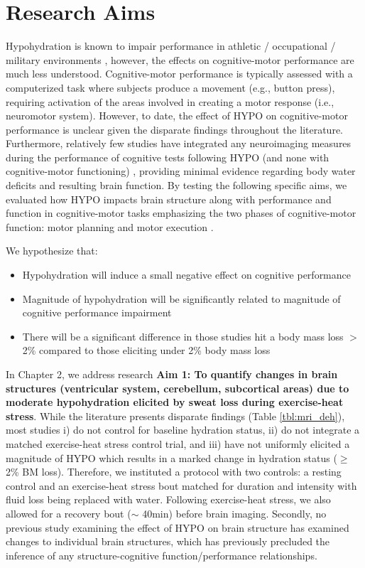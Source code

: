 \section{Research Aims}
Hypohydration is known to impair performance in athletic / occupational / military environments \cite{iom_dietary_2004}, however, the effects on cognitive-motor performance are much less understood. Cognitive-motor performance is typically assessed with a computerized task where subjects produce a movement (e.g., button press), requiring activation of the areas involved in creating a motor response (i.e., neuromotor system). However, to date, the effect of HYPO on cognitive-motor performance is unclear given the disparate findings throughout the literature. Furthermore, relatively few studies have integrated any neuroimaging measures during the performance of cognitive tests following HYPO (and none with cognitive-motor functioning) \cite{kempton_dehydration_2011,watson_mild_2015,szinnai_effect_2005}, providing minimal evidence regarding body water deficits and resulting brain function. By testing the following specific aims, we evaluated how HYPO impacts brain structure along with performance and function in cognitive-motor tasks emphasizing the two phases of cognitive-motor function: motor planning and motor execution \cite{crammond_prior_2000}. 

We hypothesize that:

\begin{itemize}
	\item Hypohydration will induce a small negative effect on cognitive performance
	\item Magnitude of hypohydration will be significantly related to magnitude of cognitive performance impairment 
	\item There will be a significant difference in those studies hit a body mass loss ${>}$2\% compared to those eliciting under 2\% body mass loss  
\end{itemize}

In Chapter 2, we address research \textbf{Aim 1: To quantify changes in brain structures (ventricular system, cerebellum, subcortical areas) due to moderate hypohydration elicited by sweat loss during exercise-heat stress}. While the literature presents disparate findings (Table \ref{tbl:mri_deh}), most studies i) do not control for baseline hydration status, ii) do not integrate a matched exercise-heat stress control trial, and iii) have not uniformly elicited a magnitude of HYPO which results in a marked change in hydration status (${\ge}$2\% BM loss). Therefore, we instituted a protocol with two controls: a resting control and an exercise-heat stress bout matched for duration and intensity with fluid loss being replaced with water. Following exercise-heat stress, we also allowed for a recovery bout (${\sim}$ 40min) before brain imaging. Secondly, no previous study examining the effect of HYPO on brain structure has examined changes to individual brain structures, which has previously precluded the inference of any structure-cognitive function/performance relationships.

